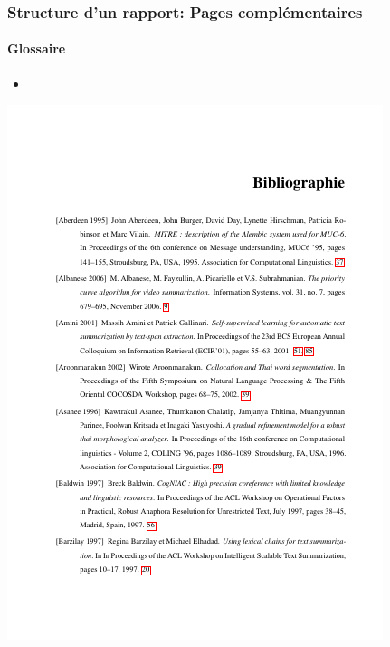 \documentclass[xcolor=table]{beamer}
\begin{document}
\begin{frame}
\frametitle{Structure d'un rapport: Pages complémentaires}
\framesubtitle{Glossaire}

\begin{minipage}{0.52\textwidth}
	\begin{itemize}
		\item 
	\end{itemize}
\end{minipage}
\begin{minipage}{0.42\textwidth}
	\includegraphics[width=\textwidth]{..//img/Bweb03-redaction/bibliographie.png}
\end{minipage}

\end{frame}
\end{document}

